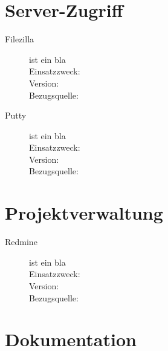 \documentclass[12pt, a4paper]{report}
\begin{document}
		
	
	
	\section{Server-Zugriff}
	
	\begin{description}
		\item [Filezilla] ist ein bla \\
		Einsatzzweck: \\
		Version: \\
		Bezugsquelle: \\
		
		
		\item [Putty] ist ein bla \\
		Einsatzzweck: \\
		Version: \\
		Bezugsquelle: \\
	\end{description}
		
	
	
	\section{Projektverwaltung}
	
	\begin{description}
		\item [Redmine] ist ein bla \\
		Einsatzzweck: \\
		Version: \\
		Bezugsquelle: \\
	\end{description}
	
	
	\section{Dokumentation}
	
\end{document}
